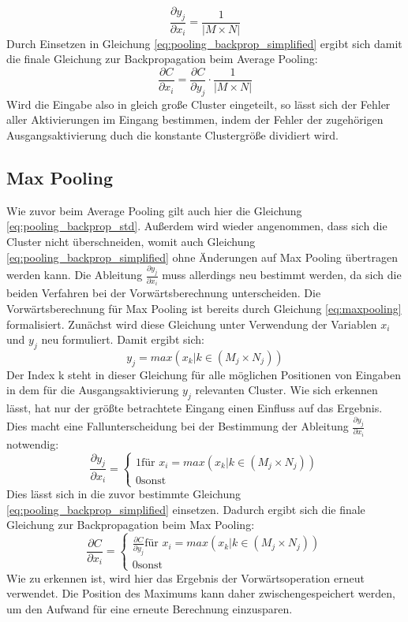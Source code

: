 \documentclass[../main.tex]{subfiles}
\begin{document}
\begin{equation}
\frac{\partial y_j}{\partial x_i} = \frac{1}{|M\times{N}|}
\end{equation}
Durch Einsetzen in Gleichung \ref{eq:pooling_backprop_simplified} ergibt sich damit die finale Gleichung zur Backpropagation beim Average Pooling: 
\begin{equation} \label{eq:pooling_backprop_avg_final}
\frac{\partial C}{\partial x_i} = \frac{\partial C}{\partial y_j} \cdot \frac{1}{|M\times{N}|}
\end{equation}
Wird die Eingabe also in gleich große Cluster eingeteilt, so lässt sich der Fehler aller Aktivierungen im Eingang bestimmen, indem der Fehler der zugehörigen Ausgangsaktivierung duch die konstante Clustergröße dividiert wird. 
\subsection{Max Pooling}
Wie zuvor beim Average Pooling gilt auch hier die Gleichung \ref{eq:pooling_backprop_std}. Außerdem wird wieder angenommen, dass sich die Cluster nicht überschneiden, womit auch Gleichung \ref{eq:pooling_backprop_simplified} ohne Änderungen auf Max Pooling übertragen werden kann. Die Ableitung \(\frac{\partial y_j}{\partial x_i}\) muss allerdings neu bestimmt werden, da sich die beiden Verfahren bei der Vorwärtsberechnung unterscheiden. 
Die Vorwärtsberechnung für Max Pooling ist bereits durch Gleichung \ref{eq:maxpooling} formalisiert. Zunächst wird diese Gleichung unter Verwendung der Variablen \(x_i\) und \(y_j\) neu formuliert. Damit ergibt sich: 
\begin{equation}
y_j = max( {x_k | k \in (M_j \times N_j)})
\end{equation}
Der Index k steht in dieser Gleichung für alle möglichen Positionen von Eingaben in dem für die Ausgangsaktivierung \(y_j\) relevanten Cluster. Wie sich erkennen lässt, hat nur der größte betrachtete Eingang einen Einfluss auf das Ergebnis. Dies macht eine Fallunterscheidung bei der Bestimmung der Ableitung \(\frac{\partial y_j}{\partial x_i}\) notwendig: 
\begin{equation}
   \frac{\partial y_j}{\partial x_i} = 
   \begin{cases}
     1 \text{für } x_i = max( {x_k | k \in (M_j \times N_j)}) \\
     0 \text{sonst}
   \end{cases}
\end{equation}
Dies lässt sich in die zuvor bestimmte Gleichung \ref{eq:pooling_backprop_simplified} einsetzen. Dadurch ergibt sich die finale Gleichung zur Backpropagation beim Max Pooling: 
\begin{equation} \label{eq:pooling_backprop_max_final}
   \frac{\partial C}{\partial x_i} = 
   \begin{cases}
     \frac{\partial C}{\partial y_j} \text{für } x_i = max( {x_k | k \in (M_j \times N_j)}) \\
     0 \text{sonst}
   \end{cases}
\end{equation}
Wie zu erkennen ist, wird hier das Ergebnis der Vorwärtsoperation erneut verwendet. Die Position des Maximums kann daher zwischengespeichert werden, um den Aufwand für eine erneute Berechnung einzusparen. 
\end{document}
